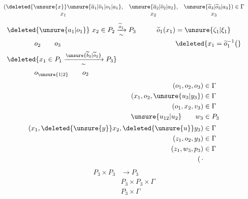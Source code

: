 \[
 \begin{array}{ccc}
 (\deleted{\unsure{x}} \unsure{\overline{a}_1|\overline{o}_1|o_1|a_1},&\unsure{\overline{a}_2|\overline{o}_2|a_2},&\unsure{\widetilde{a}_3|\widetilde{o}_3|a_3})\in \Gamma\\
 x_1&x_2&x_3
 \end{array}
\]
\[
\begin{aligned}
 &\deleted{\unsure{a_1|o_1}}\ x_2\in P_2 \xrightarrow[\sim]{\widetilde o_1}P_3
 &\qquad \widetilde o_1(x_1)&=\unsure{\zeta_1|\xi_1}\\
 &\hspace{4em}o_2\qquad o_3 &&\deleted{x_1=\widetilde o_1^{-1}\bigl(}\\
 &\deleted{x_1\in P_1\xrightarrow[\sim]{\unsure{\widetilde b_2|\widetilde o_2}}P_3}\\
 &\hspace{4em}o_{\unsure{1|2}}\qquad o_2
\end{aligned}
\]
\[
\begin{aligned}
 (o_1,o_2,o_3)&\in \Gamma\\
 (x_1,o_2,\unsure{u_3|y_3})&\in \Gamma\\
 (o_1,x_2,v_3)&\in \Gamma\\
 \unsure{u_{12}|u_2}\qquad w_3&\in P_3\\[2pt]
 (x_1,\deleted{\unsure{y}}x_2,\deleted{\unsure{u}}y_3)&\in \Gamma\\
 (z_1,o_2,y_3)&\in \Gamma\\
 (z_1,w_3,p_3)&\in \Gamma\\
 (\,\cdot
\end{aligned}
\]
\[
 \begin{aligned}
 P_3\times P_3&\longrightarrow P_3\\
 &P_3\times P_3\times \Gamma\\
 &P_3\times \Gamma
 \end{aligned}
\]
